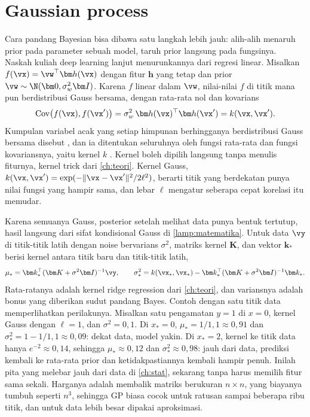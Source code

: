 \section{Gaussian process}

Cara pandang Bayesian bisa dibawa satu langkah lebih jauh: alih-alih menaruh prior pada parameter sebuah model, taruh prior langsung
pada fungsinya. Naskah kuliah deep learning lanjut menurunkannya dari regresi linear. Misalkan $f(\vx)=\vw^\top\bm h(\vx)$ dengan fitur
$\bm h$ yang tetap dan prior $\vw\sim\N(\bm0,\sigma_w^2\bm I)$. Karena $f$ linear dalam $\vw$, nilai-nilai $f$ di titik mana pun berdistribusi
Gauss bersama, dengan rata-rata nol dan kovarians
\begin{equation}
\mathrm{Cov}\big(f(\vx),f(\vx')\big)=\sigma_w^2\,\bm h(\vx)^\top\bm h(\vx')=k(\vx,\vx').
\end{equation}
Kumpulan variabel acak yang setiap himpunan berhingganya berdistribusi Gauss bersama disebut , dan ia
ditentukan seluruhnya oleh fungsi rata-rata dan fungsi kovariansnya, yaitu kernel $k$ \citep{rasmussen2006}. Kernel boleh dipilih langsung
tanpa menulis fiturnya, kernel trick dari \cref{ch:teori}. Kernel Gauss, $k(\vx,\vx')=\exp(-\|\vx-\vx'\|^2/2\ell^2)$, berarti titik yang
berdekatan punya nilai fungsi yang hampir sama, dan lebar $\ell$ mengatur seberapa cepat korelasi itu memudar.

Karena semuanya Gauss, posterior setelah melihat data punya bentuk tertutup, hasil langsung dari sifat kondisional Gauss di
\cref{lamp:matematika}. Untuk data $\vy$ di titik-titik latih dengan noise bervarians $\sigma^2$, matriks kernel $\bm K$, dan vektor
$\bm k_*$ berisi kernel antara titik baru dan titik-titik latih,
\begin{equation}
\mu_*=\bm k_*^\top(\bm K+\sigma^2\bm I)^{-1}\vy,\qquad
\sigma_*^2=k(\vx_*,\vx_*)-\bm k_*^\top(\bm K+\sigma^2\bm I)^{-1}\bm k_* .
\end{equation}
Rata-ratanya adalah kernel ridge regression dari \cref{ch:teori}, dan variansnya adalah bonus yang diberikan sudut pandang Bayes. Contoh
dengan satu titik data memperlihatkan perilakunya. Misalkan satu pengamatan $y=1$ di $x=0$, kernel Gauss dengan $\ell=1$, dan
$\sigma^2=0{,}1$. Di $x_*=0$, $\mu_*=1/1{,}1\approx0{,}91$ dan $\sigma_*^2=1-1/1{,}1\approx0{,}09$: dekat data, model yakin. Di $x_*=2$, kernel
ke titik data hanya $e^{-2}\approx0{,}14$, sehingga $\mu_*\approx0{,}12$ dan $\sigma_*^2\approx0{,}98$: jauh dari data, prediksi kembali ke
rata-rata prior dan ketidakpastiannya kembali hampir penuh. Inilah pita yang melebar jauh dari data di \cref{ch:stat}, sekarang tanpa harus
memilih fitur sama sekali. Harganya adalah membalik matriks berukuran $n\times n$, yang biayanya tumbuh seperti $n^3$, sehingga GP biasa
cocok untuk ratusan sampai beberapa ribu titik, dan untuk data lebih besar dipakai aproksimasi.


